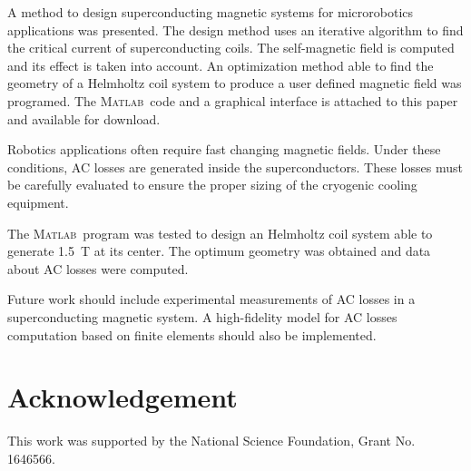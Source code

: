 \documentclass{ws-jmrr}
\newcommand{\MATLAB}{{\textsc{Matlab}}}
\begin{document}
\begin{multicols}{2}
A method to design superconducting magnetic systems for microrobotics applications was presented. 
 The design method uses an iterative algorithm to find the critical current of superconducting coils. 
  The self-magnetic field is computed and its effect is taken into account. 
  An optimization method able to find the geometry of a Helmholtz coil system to produce a user defined magnetic field was programed. 
  The \MATLAB ~code and a graphical interface is attached to this paper and available for download.\par
Robotics applications often require fast changing magnetic fields.
 Under these conditions, AC losses are generated inside the superconductors. 
 These losses must be carefully evaluated to ensure the proper sizing of the cryogenic cooling equipment.\par
The \MATLAB ~program was tested to design an Helmholtz coil system able to generate 1.5~T at its center. The optimum geometry was obtained and data about AC losses were computed.\par
Future work should include experimental measurements of AC losses in a superconducting magnetic system.
 A high-fidelity model for AC losses computation based on finite elements should also be implemented.
 
 \section*{Acknowledgement}
This work was supported by the National Science Foundation, Grant No. 1646566. %





\end{multicols} 
\end{document}
